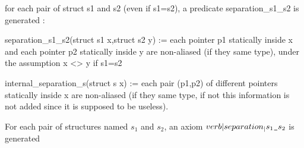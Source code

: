 for each pair of struct s1 and s2 (even if s1=s2), a predicate
separation_s1_s2 is generated :

separation_s1_s2(struct s1 x,struct s2 y) := 
  each pointer p1 statically inside x and each
  pointer p2 statically inside y are non-aliased (if they same type),
  under the assumption x <> y if s1=s2

  

internal_separation_s(struct s x) := 
  each pair (p1,p2) of different pointers statically
  inside x are non-aliased (if they same type, if not this information
  is not added since it is supposed to be useless).







For each pair of structures named $s_1$ and $s_2$, an axiom 
$verb|separation_|s_1\verb|_|s_2$ is generated